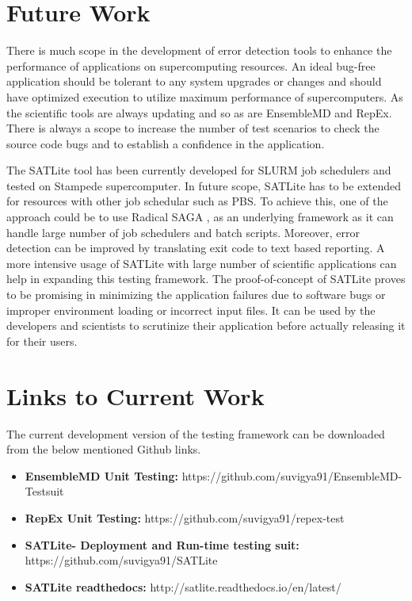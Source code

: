 \documentclass[10pt]{ruthesis}
\begin{document}
\section{Future Work}
There is much scope in the development of error detection tools to enhance the performance of applications on supercomputing resources. An ideal bug-free application should be tolerant to any system upgrades or changes and should have optimized execution to utilize maximum performance of supercomputers. As the scientific tools are always updating and so as are EnsembleMD and RepEx. There is always a scope to increase the number of test scenarios to check the source code bugs and to establish a confidence in the application. 

The SATLite tool has been currently developed for SLURM job schedulers and tested on Stampede supercomputer. In future scope, SATLite has to be extended for resources with other job schedular such as PBS. To achieve this, one of the approach could be to use Radical SAGA \cite{ref23},\cite{site9} as an underlying framework as it can handle large number of job schedulers and batch scripts. Moreover, error detection can be improved by translating exit code to text based reporting. A more intensive usage of SATLite with large number of scientific applications can help in expanding this testing framework. The proof-of-concept of SATLite proves to be promising in minimizing the application failures due to software bugs or improper environment loading or incorrect input files. It can be used by the developers and scientists to scrutinize their application before actually releasing it for their users.

\section{Links to Current Work}
The current development version of the testing framework can be downloaded from the below mentioned Github links.

\begin{itemize}
\item \textbf{EnsembleMD Unit Testing:} https://github.com/suvigya91/EnsembleMD-Testsuit

\item \textbf{RepEx Unit Testing:} https://github.com/suvigya91/repex-test

\item \textbf{SATLite- Deployment and Run-time testing suit:} https://github.com/suvigya91/SATLite

\item \textbf{SATLite readthedocs:} http://satlite.readthedocs.io/en/latest/
\end{itemize}
%
\end{document}
